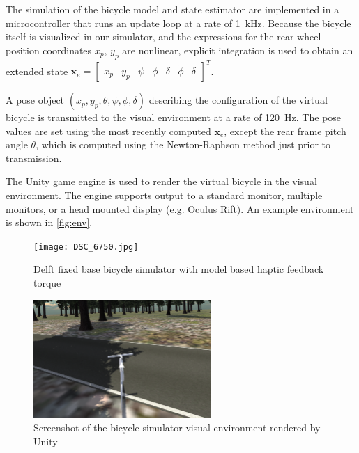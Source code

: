 \documentclass{icsc2017a}
\newcommand{\x}{x_{p}}
\newcommand{\y}{y_{p}}
\newcommand{\pitch}{\theta}
\newcommand{\yaw}{\psi}
\newcommand{\roll}{\phi}
\newcommand{\steer}{\delta}
\newcommand{\rollRate}{\dot{\phi}}
\newcommand{\steerRate}{\dot{\delta}}
\begin{document}
The simulation of the bicycle model and state estimator are implemented in a microcontroller that runs an update loop at
a rate of \SI{1}{\kilo\hertz}.
Because the bicycle itself is visualized in our simulator, and the expressions for the rear wheel position coordinates
$\x$, $\y$ are nonlinear, explicit integration is used to obtain an extended state
$\bm{x}_e = \begin{bmatrix} \x & \y & \yaw & \roll & \steer & \rollRate & \steerRate \end{bmatrix}^T$.

A pose object $\left( \x, \y, \pitch, \yaw, \roll, \steer \right)$ describing the configuration of the virtual bicycle
is transmitted to the visual environment at a rate of \SI{120}{\hertz}.
The pose values are set using the most recently computed $\bm{x}_e$, except the rear frame pitch angle $\pitch$, which is computed
using the Newton-Raphson method just prior to transmission.

The Unity game engine is used to render the virtual bicycle in the visual environment.
The engine supports output to a standard monitor, multiple monitors, or a head mounted display (e.g. Oculus Rift).
An example environment is shown in \autoref{fig:env}.

\begin{figure}
\centering
\begin{minipage}[t]{0.45\textwidth}
    \centering
    \captionsetup{width=\linewidth}
    \texttt{[image: DSC\_6750.jpg]}
    \caption{Delft fixed base bicycle simulator with model based haptic feedback torque}
    \label{fig:mech}
\end{minipage}
\hfill
\begin{minipage}[t]{0.45\textwidth}
    \centering
    \captionsetup{width=\linewidth}
    \includegraphics[height=4.5cm]{unity_env.png}
    \caption{Screenshot of the bicycle simulator visual environment rendered by Unity}
    \label{fig:env}
\end{minipage}
\end{figure}
\end{document}
